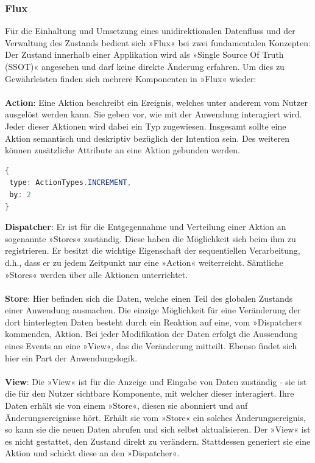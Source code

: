 \subsubsection{Flux}
Für die Einhaltung und Umsetzung eines unidirektionalen Datenfluss und der Verwaltung des Zustands bedient sich »Flux« bei zwei fundamentalen Konzepten: Der Zustand innerhalb einer Applikation wird als »Single Source Of Truth (SSOT)« angesehen und darf keine direkte Änderung erfahren. Um dies zu Gewährleisten finden sich mehrere Komponenten in »Flux« wieder:
\\
\\
\textbf{Action}: Eine Aktion beschreibt ein Ereignis, welches unter anderem vom Nutzer ausgelöst werden kann. Sie geben vor, wie mit der Anwendung interagiert wird. Jeder dieser Aktionen wird dabei ein Typ zugewiesen. Insgesamt sollte eine Aktion semantisch und deskriptiv bezüglich der Intention sein. Des weiteren können zusätzliche Attribute an eine Aktion gebunden werden.
\\
\begin{lstlisting}[frame=single, language=Java]
{
 type: ActionTypes.INCREMENT,
 by: 2
}
\end{lstlisting}
\bigskip
\textbf{Dispatcher}: Er ist für die Entgegennahme und Verteilung einer Aktion an sogenannte »Stores« zuständig. Diese haben die Möglichkeit sich beim ihm zu registrieren. Er besitzt die wichtige Eigenschaft der sequentiellen Verarbeitung, d.h., dass er zu jedem Zeitpunkt nur eine »Action« weiterreicht. Sämtliche »Stores« werden über alle Aktionen unterrichtet.
\\
\\
\textbf{Store}: Hier befinden sich die Daten, welche einen Teil des globalen Zustands einer Anwendung ausmachen. Die einzige Möglichkeit für eine Veränderung der dort hinterlegten Daten besteht durch ein Reaktion auf eine, vom »Dispatcher« kommenden, Aktion. Bei jeder Modifikation der Daten erfolgt die Aussendung eines Events an eine »View«, das die Veränderung mitteilt.
Ebenso findet sich hier ein Part der Anwendungslogik.
\\
\\
\textbf{View}: Die »View« ist für die Anzeige und Eingabe von Daten zuständig - sie ist die für den Nutzer sichtbare Komponente, mit welcher dieser interagiert. Ihre Daten erhält sie von einem »Store«, diesen sie abonniert und auf Änderungsereignisse hört. Erhält sie vom »Store« ein solches Änderungsereignis, so kann sie die neuen Daten abrufen und sich selbst aktualisieren. Der »View« ist es nicht gestattet, den Zustand direkt zu verändern. Stattdessen generiert sie eine Aktion und schickt diese an den »Dispatcher«.
